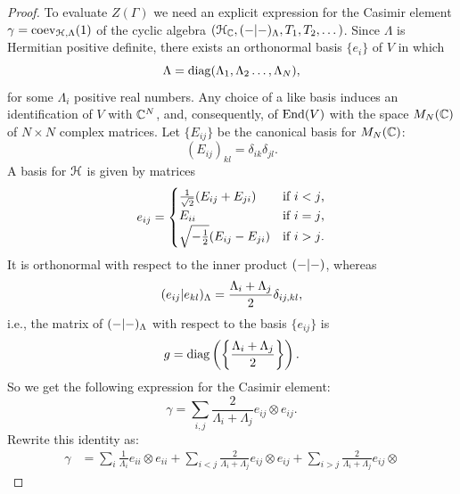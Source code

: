 \begin{proof}
  To evaluate $Z(\Gamma)$ we need an explicit expression for the
  Casimir element $\gamma = \coev_{\Hermitian[N],\Lambda}(1)$ of the cyclic
  algebra $(\Hermitian[N]_\setC, \inner[\Lambda]{-}{-}, T_1, T_2,
  \dots)$.  Since $\Lambda$ is Hermitian positive definite, there
  exists an orthonormal basis $\{e_i\}$ of $V$ in which
  \begin{equation*}
    \Lambda=\diag(\Lambda_1,\Lambda_2\dots,\Lambda_N),
  \end{equation*}
  for some $\Lambda_i$ positive real numbers. Any choice of a like basis
  induces an identification of $V$ with $\setC^N$, and, consequently,
  of $\End(V)$ with the space $M_N(\setC)$ of $N \times N$ complex
  matrices. Let $\{E_{ij}\}$ be the canonical basis for $M_N(\setC)$:
  \begin{equation*}
    (E_{ij})_{kl}=\delta_{ik}\delta_{jl}. 
  \end{equation*}
  A basis for $\Hermitian[N]$ is given by matrices
  \begin{equation*}
    e_{ij}=\begin{cases}
      \frac{1}{\sqrt{2}} (E_{ij}+E_{ji}) &\text{if $i<j$,}\\
      E_{ii}                             &\text{if $i=j$,}\\
      \sqrt{-\onehalf} (E_{ij}-E_{ji})   &\text{if $i>j$.} 
    \end{cases}
  \end{equation*}
  It is orthonormal with respect to the inner product
  $\inner{-}{-}$, whereas 
  \begin{equation*}
    \inner[\Lambda]{e_{ij}}{e_{kl}}
    = \frac{\Lambda_i + \Lambda_j}{2} \delta_{ij,kl},
  \end{equation*}
  i.e., the matrix of $\inner[\Lambda]{-}{-}$ with respect to the
  basis $\{e_{ij}\}$ is
  \begin{equation*}
    g = \diag\left(\left\{ \frac{\Lambda_i + \Lambda_j}{2}
      \right\}\right). 
  \end{equation*}
  So we get the following expression for the Casimir element:
  \begin{equation*}
    \gamma = \sum_{i,j} \frac{2}{\Lambda_i+\Lambda_j} e_{ij} \otimes e_{ij}. 
  \end{equation*}
  Rewrite this identity as:
  \begin{align*}
    \gamma &=\sum_{i}\frac{1}{{\Lambda_i}}e_{ii}\otimes
        e_{ii}+\sum_{i<j}\frac{2}{{\Lambda_i+\Lambda_j}}e_{ij}\otimes
        e_{ij}+\sum_{i>j}\frac{2}{{\Lambda_i+\Lambda_j}}e_{ij}\otimes

\end{align*}
\end{proof}
